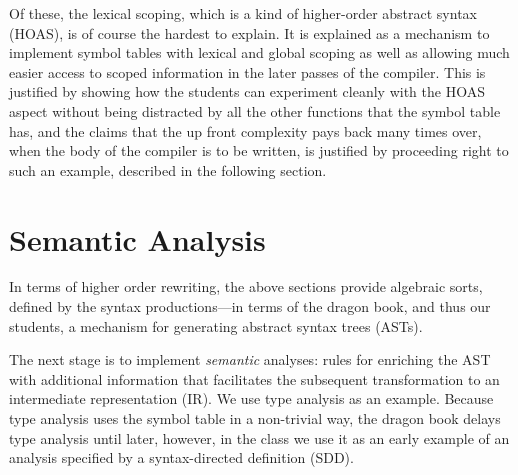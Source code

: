 \documentclass{article}
\begin{document}
Of these, the lexical scoping, which is a kind of higher-order abstract syntax (HOAS), is of course
the hardest to explain.  It is explained as a mechanism to implement symbol tables with lexical and
global scoping as well as allowing much easier access to scoped information in the later passes of
the compiler.  This is justified by showing how the students can experiment cleanly with the HOAS
aspect without being distracted by all the other functions that the symbol table has, and the claims
that the up front complexity pays back many times over, when the body of the compiler is to be
written, is justified by proceeding right to such an example, described in the following section.


\section{Semantic Analysis}
\label{sec:analysis}

In terms of higher order rewriting, the above sections provide algebraic sorts, defined by the
syntax productions---in terms of the dragon book, and thus our students, a mechanism for generating
abstract syntax trees (ASTs).

The next stage is to implement \emph{semantic} analyses: rules for enriching the AST with additional
information that facilitates the subsequent transformation to an intermediate representation (IR).
We use type analysis as an example.  Because type analysis uses the symbol table in a non-trivial
way, the dragon book delays type analysis until later, however, in the class we use it as an early
example of an analysis specified by a syntax-directed definition (SDD).
\end{document}
